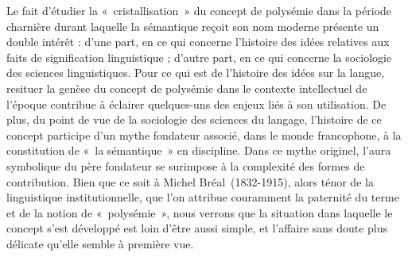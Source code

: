 \documentclass[output=paper]{langsci/langscibook}
\begin{document}
Le fait d’étudier la «~cristallisation~» du concept de polysémie dans la période charnière durant laquelle la sémantique reçoit son nom moderne présente un double intérêt : d’une part, en ce qui concerne l’histoire des idées relatives aux faits de signification linguistique ; d’autre part, en ce qui concerne la sociologie des sciences linguistiques. Pour ce qui est de l’histoire des idées sur la langue, resituer la genèse du concept de polysémie dans le contexte intellectuel de l’époque contribue à éclairer quelques-uns des enjeux liés à son utilisation. De plus, du point de vue de la sociologie des sciences du langage, l’histoire de ce concept participe d’un mythe fondateur associé, dans le monde francophone, à la constitution de «~la sémantique~» en discipline. Dans ce mythe originel, l’aura symbolique du père fondateur se surimpose à la complexité des formes de contribution. Bien que ce soit à Michel Bréal~(1832-1915), alors ténor de la linguistique institutionnelle, que l’on attribue couramment la paternité du terme et de la notion de «~polysémie~», nous verrons que la situation dans laquelle le concept s’est développé est loin d’être aussi simple, et l’affaire sans doute plus délicate qu’elle semble à première vue.
 
\end{document}
